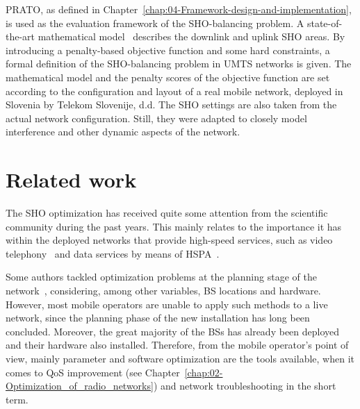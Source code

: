 \bigskip{}


PRATO, as defined in Chapter~\ref{chap:04-Framework-design-and-implementation},
is used as the evaluation framework of the SHO-balancing problem.
A state-of-the-art mathematical model~\cite{Nawrocki-Understanding_UMTS_radio_network_modelling_and_optimisation:2006}
describes the downlink and uplink SHO areas. By introducing a penalty-based
objective function and some hard constraints, a formal definition
of the SHO-balancing problem in UMTS networks is given. The mathematical
model and the penalty scores of the objective function are set according
to the configuration and layout of a real mobile network, deployed
in Slovenia by Telekom Slovenije, d.d. The SHO settings are also taken
from the actual network configuration. Still, they were adapted to
closely model interference and other dynamic aspects of the network.


\section{Related work \label{sec:07-Related-work}}

The SHO optimization has received quite some attention from the scientific
community during the past years. This mainly relates to the importance
it has within the deployed networks that provide high-speed services,
such as video telephony~\cite{chen2010_impact_of_soft_handover}
and data services by means of HSPA~\cite{chen2008cpich,chen2011_coverage_planning_for_optimizing_HSDPA}.

Some authors tackled optimization problems at the planning stage of
the network~\cite{Eisenblatter_OptimizationMethodsForUMTSRadioNetworkPlanning,ghosh2011_optimising_CDMA_cell_planning},
considering, among other variables, BS locations and hardware. However,
most mobile operators are unable to apply such methods to a live network,
since the planning phase of the new installation has long been concluded.
Moreover, the great majority of the BSs has already been deployed
and their hardware also installed. Therefore, from the mobile operator's
point of view, mainly parameter and software optimization are the
tools available, when it comes to QoS improvement (see Chapter~\ref{chap:02-Optimization_of_radio_networks})
and network troubleshooting in the short term.


